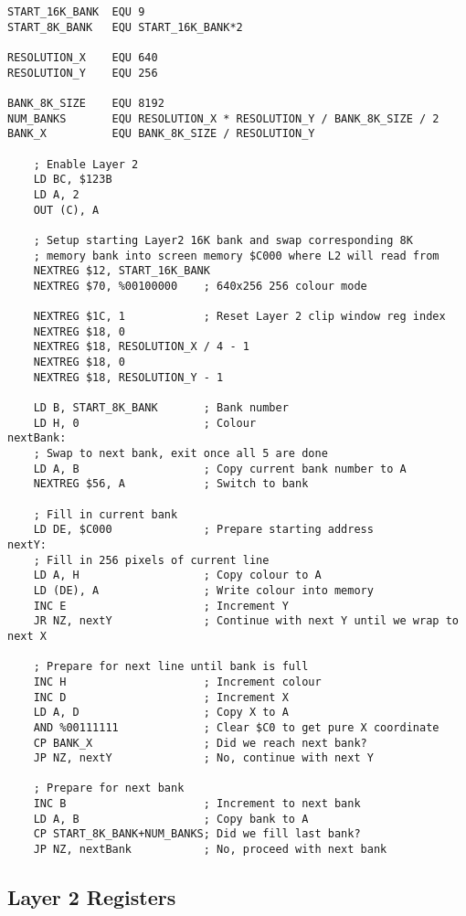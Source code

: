\documentclass[12pt,twoside,openright,a4paper]{book}
\begin{document}
\begin{Verbatim}
START_16K_BANK  EQU 9
START_8K_BANK   EQU START_16K_BANK*2

RESOLUTION_X    EQU 640
RESOLUTION_Y    EQU 256

BANK_8K_SIZE    EQU 8192
NUM_BANKS       EQU RESOLUTION_X * RESOLUTION_Y / BANK_8K_SIZE / 2
BANK_X          EQU BANK_8K_SIZE / RESOLUTION_Y

	; Enable Layer 2
	LD BC, $123B
	LD A, 2
	OUT (C), A

	; Setup starting Layer2 16K bank and swap corresponding 8K
	; memory bank into screen memory $C000 where L2 will read from
	NEXTREG $12, START_16K_BANK
	NEXTREG $70, %00100000    ; 640x256 256 colour mode

	NEXTREG $1C, 1            ; Reset Layer 2 clip window reg index
	NEXTREG $18, 0
	NEXTREG $18, RESOLUTION_X / 4 - 1
	NEXTREG $18, 0
	NEXTREG $18, RESOLUTION_Y - 1

	LD B, START_8K_BANK       ; Bank number
	LD H, 0                   ; Colour
nextBank:
	; Swap to next bank, exit once all 5 are done
	LD A, B                   ; Copy current bank number to A
	NEXTREG $56, A            ; Switch to bank

	; Fill in current bank
	LD DE, $C000              ; Prepare starting address
nextY:
	; Fill in 256 pixels of current line
	LD A, H                   ; Copy colour to A
	LD (DE), A                ; Write colour into memory
	INC E                     ; Increment Y
	JR NZ, nextY              ; Continue with next Y until we wrap to next X

	; Prepare for next line until bank is full
	INC H                     ; Increment colour
	INC D                     ; Increment X
	LD A, D                   ; Copy X to A
	AND %00111111             ; Clear $C0 to get pure X coordinate
	CP BANK_X                 ; Did we reach next bank?
	JP NZ, nextY              ; No, continue with next Y

	; Prepare for next bank
	INC B                     ; Increment to next bank
	LD A, B                   ; Copy bank to A
	CP START_8K_BANK+NUM_BANKS; Did we fill last bank?
	JP NZ, nextBank           ; No, proceed with next bank
\end{Verbatim}


\subsection{Layer 2 Registers}
\label{zx_next_layer2_registers}
\end{document}
